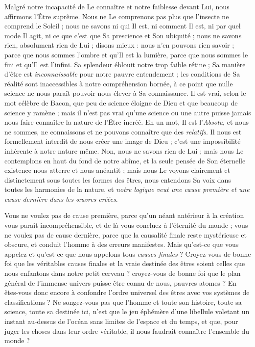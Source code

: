 \documentclass[a4paper, 11pt, oneside, landscape]{article}
\begin{document}
Malgré notre incapacité de Le connaître et notre faiblesse devant Lui, nous affirmons l'Être suprême. Nous ne Le comprenons pas plus que l'insecte ne comprend le Soleil ; nous ne savons ni qui Il est, ni comment Il est, ni par quel mode Il agit, ni ce que c'est que Sa prescience et Son ubiquité ; nous ne savons rien, absolument rien de Lui ; disons mieux : nous n'en pouvons rien savoir ; parce que nous sommes l'ombre et qu'Il est la lumière, parce que nous sommes le fini et qu'Il est l'infini. Sa splendeur éblouit notre trop faible rétine ; Sa manière d'être est \emph{inconnaissable} pour notre pauvre entendement ; les conditions de Sa réalité sont inaccessibles à notre compréhension bornée, à ce point que nulle science ne nous paraît pouvoir nous élever à Sa connaissance. Il est vrai, selon le mot célèbre de Bacon, que peu de science éloigne de Dieu et que beaucoup de science y ramène ; mais il n'est pas vrai qu'une science ou une autre puisse jamais nous faire connaître la nature de l'Être incréé. En un mot, Il est l'\emph{Absolu}, et nous ne sommes, ne connaissons et ne pouvons connaître que des \emph{relatifs}. Il nous est formellement interdit de nous créer une image de Dieu ; c'est une impossibilité inhérente à notre nature même. Non, nous ne savons rien de Lui ; mais nous Le contemplons en haut du fond de notre abîme, et la seule pensée de Son éternelle existence nous atterre et nous anéantit ; mais nous Le voyons clairement et distinctement sous toutes les formes des êtres, nous entendons Sa voix dans toutes les harmonies de la nature, et \emph{notre logique veut une cause première et une cause dernière dans les œuvres créées}.

Vous ne voulez pas de cause première, parce qu'un néant antérieur à la création vous paraît incompréhensible, et de là vous concluez à l'éternité du monde ; vous ne voulez pas de cause dernière, parce que la causalité finale reste mystérieuse et obscure, et conduit l'homme à des erreurs manifestes. Mais qu'est-ce que vous appelez et qu'est-ce que nous appelons tous \emph{causes finales} ? Croyez-vous de bonne foi que les véritables causes finales et la vraie destinée des êtres soient celles que nous enfantons dans notre petit cerveau ? croyez-vous de bonne foi que le plan général de l'immense univers puisse être connu de nous, pauvres atomes ? En êtes-vous donc encore à confondre l'ordre universel des êtres avec vos systèmes de classifications ? Ne songez-vous pas que l'homme et toute son histoire, toute sa science, toute sa destinée ici, n'est que le jeu éphémère d'une libellule voletant un instant au-dessus de l'océan sans limites de l'espace et du temps, et que, pour juger les choses dans leur ordre véritable, il nous faudrait connaître l'ensemble du monde ?
\end{document}
